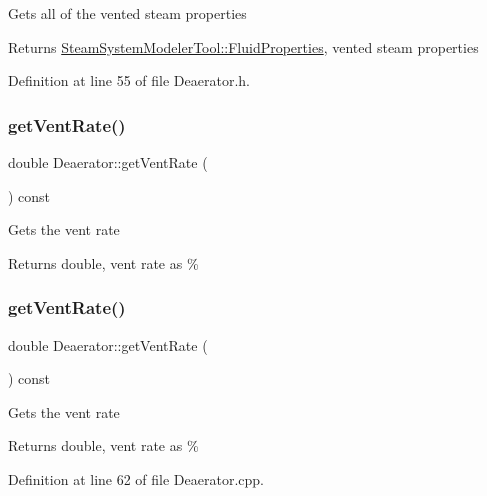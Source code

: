 Gets all of the vented steam properties \begin{DoxyReturn}{Returns}
\hyperlink{struct_steam_system_modeler_tool_1_1_fluid_properties}{Steam\+System\+Modeler\+Tool\+::\+Fluid\+Properties}, vented steam properties 
\end{DoxyReturn}


Definition at line 55 of file Deaerator.\+h.

\mbox{\label{class_deaerator_ad0262491c2bd9a6f820eaaba54498bcd}} 
\subsubsection{\texorpdfstring{get\+Vent\+Rate()}{getVentRate()}\hspace{0.1cm}{\footnotesize\ttfamily [1/3]}}
{\footnotesize\ttfamily double Deaerator\+::get\+Vent\+Rate (\begin{DoxyParamCaption}{ }\end{DoxyParamCaption}) const}

Gets the vent rate \begin{DoxyReturn}{Returns}
double, vent rate as \% 
\end{DoxyReturn}
\mbox{\label{class_deaerator_ad0262491c2bd9a6f820eaaba54498bcd}} 
\subsubsection{\texorpdfstring{get\+Vent\+Rate()}{getVentRate()}\hspace{0.1cm}{\footnotesize\ttfamily [2/3]}}
{\footnotesize\ttfamily double Deaerator\+::get\+Vent\+Rate (\begin{DoxyParamCaption}{ }\end{DoxyParamCaption}) const}

Gets the vent rate \begin{DoxyReturn}{Returns}
double, vent rate as \% 
\end{DoxyReturn}


Definition at line 62 of file Deaerator.\+cpp.

\mbox{\label{class_deaerator_ad0262491c2bd9a6f820eaaba54498bcd}} 
